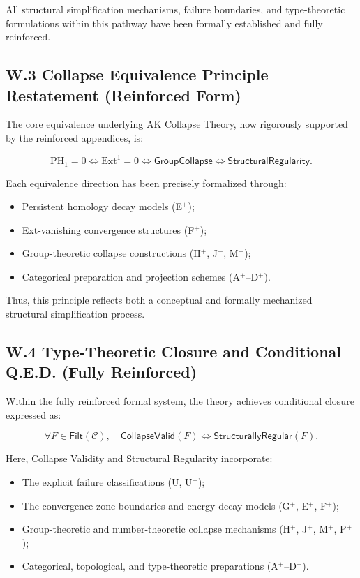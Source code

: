 \documentclass[11pt]{article}
\begin{document}
All structural simplification mechanisms, failure boundaries, and type-theoretic formulations within this pathway have been formally established and fully reinforced.

\subsection*{W.3 Collapse Equivalence Principle Restatement (Reinforced Form)}

The core equivalence underlying AK Collapse Theory, now rigorously supported by the reinforced appendices, is:

\[
\mathrm{PH}_1 = 0 \iff \mathrm{Ext}^1 = 0 \iff \mathsf{GroupCollapse} \iff \mathsf{StructuralRegularity}.
\]

Each equivalence direction has been precisely formalized through:

\begin{itemize}
    \item Persistent homology decay models (E$^{+}$);
    \item Ext-vanishing convergence structures (F$^{+}$);
    \item Group-theoretic collapse constructions (H$^{+}$, J$^{+}$, M$^{+}$);
    \item Categorical preparation and projection schemes (A$^{+}$–D$^{+}$).
\end{itemize}

Thus, this principle reflects both a conceptual and formally mechanized structural simplification process.

\subsection*{W.4 Type-Theoretic Closure and Conditional Q.E.D. (Fully Reinforced)}

Within the fully reinforced formal system, the theory achieves conditional closure expressed as:

\[
\forall F \in \mathsf{Filt}(\mathcal{C}), \quad \mathsf{CollapseValid}(F) \iff \mathsf{StructurallyRegular}(F).
\]

Here, Collapse Validity and Structural Regularity incorporate:

\begin{itemize}
    \item The explicit failure classifications (U, U$^{+}$);
    \item The convergence zone boundaries and energy decay models (G$^{+}$, E$^{+}$, F$^{+}$);
    \item Group-theoretic and number-theoretic collapse mechanisms (H$^{+}$, J$^{+}$, M$^{+}$, P$^{+}$);
    \item Categorical, topological, and type-theoretic preparations (A$^{+}$–D$^{+}$).
\end{itemize}
\end{document}
